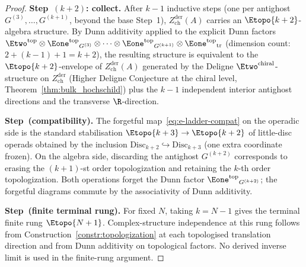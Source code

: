 \begin{proof}
\smallskip\noindent
\textbf{Step~$(k+2)$: collect.}
After $k - 1$ inductive steps (one per antighost
$G^{(3)}, \ldots, G^{(k+1)}$, beyond the base Step~1),
$Z^{\mathrm{der}}_{\mathrm{ch}}(A)$ carries an $\Etopo{k+2}$-algebra
structure. By Dunn additivity applied to the explicit Dunn factors
$\Etwo^{\mathrm{top}} \otimes {\Eone^{\mathrm{top}}}_{G^{(3)}}
\otimes \cdots \otimes {\Eone^{\mathrm{top}}}_{G^{(k+1)}}
\otimes {\Eone^{\mathrm{top}}}_{\mathrm{tr}}$ (dimension count:
$2 + (k - 1) + 1 = k + 2$), the resulting structure is equivalent to the
$\Etopo{k+2}$-envelope of $Z^{\mathrm{der}}_{\mathrm{ch}}(A)$ generated by
the Deligne $\Etwo^{\mathrm{chiral}}$-structure on
$Z^{\mathrm{der}}_{\mathrm{ch}}$ \textup{(}Higher Deligne Conjecture at
the chiral level, Theorem~\textup{\ref{thm:bulk_hochschild}}\textup{)} plus the
$k - 1$ independent interior antighost directions and the transverse
$\R$-direction.

\smallskip\noindent
\textbf{Step~(compatibility).}
The forgetful map~\eqref{eq:e-ladder-compat} on the operadic side is the
standard stabilisation $\Etopo{k+3} \to \Etopo{k+2}$ of little-disc
operads obtained by the inclusion
$\mathrm{Disc}_{k+2} \hookrightarrow \mathrm{Disc}_{k+3}$ (one extra
coordinate frozen). On the algebra side, discarding the antighost
$G^{(k+2)}$ corresponds to erasing the $(k+1)$-st order topologization
and retaining the $k$-th order topologization. Both operations forget
the Dunn factor ${\Eone^{\mathrm{top}}}_{G^{(k+2)}}$; the forgetful
diagrams commute by the associativity of Dunn additivity.

\smallskip\noindent
\textbf{Step~(finite terminal rung).}
For fixed \(N\), taking \(k=N-1\) gives the terminal finite rung
\(\Etopo{N+1}\). Complex-structure independence at this rung follows
from Construction~\ref{constr:topologization} at each topologised
translation direction and from Dunn additivity on topological factors.
No derived inverse limit is used in the finite-rung argument.
\end{proof}

